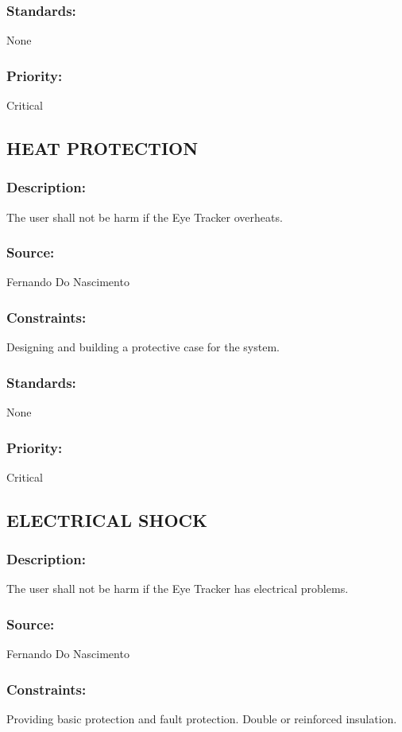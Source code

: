 \subsubsection{Standards:} 
	{None}
\subsubsection{Priority:} 
	{Critical}

\subsection{\text HEAT PROTECTION}
\subsubsection{Description:} 
	{The user shall not be harm if the Eye Tracker overheats.}
\subsubsection{Source:} 
	{Fernando Do Nascimento}
\subsubsection{Constraints:} 
	{Designing and building a protective case for the system.}
\subsubsection{Standards:} 
	{None}
\subsubsection{Priority:} 
	{Critical}

\subsection{\text ELECTRICAL SHOCK }
\subsubsection{Description:} 
	{The user shall not be harm if the Eye Tracker has electrical problems.}
\subsubsection{Source:} 
	{Fernando Do Nascimento}
\subsubsection{Constraints:} 
	{Providing basic protection and fault protection. Double or reinforced insulation.}
